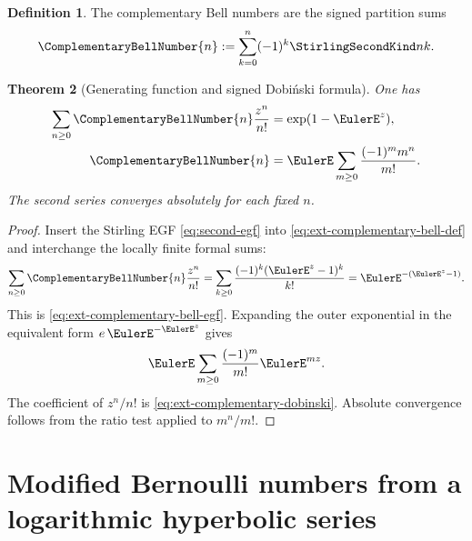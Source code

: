 \documentclass[11pt,a4paper,oneside,openany]{book}
\newtheorem{theorem}{Theorem}[chapter]
\theoremstyle{definition}
\newtheorem{definition}[theorem]{Definition}
\theoremstyle{remark}
\begin{document}
\begin{definition}
The complementary Bell numbers are the signed partition sums
\begin{equation}\label{eq:ext-complementary-bell-def}
 \ComplementaryBellNumber{n}:=\sum_{k=0}^n(-1)^k\StirlingSecondKind nk.
\end{equation}
\end{definition}

\begin{theorem}[Generating function and signed Dobi\'{n}ski formula]
One has
\begin{align}
 \sum_{n\ge0}\ComplementaryBellNumber{n}\frac{z^n}{n!}
 &=\exp(1-\EulerE^z),\label{eq:ext-complementary-bell-egf}\\
 \ComplementaryBellNumber{n}
 &=\EulerE\sum_{m\ge0}\frac{(-1)^m m^n}{m!}.\label{eq:ext-complementary-dobinski}
\end{align}
The second series converges absolutely for each fixed \(n\).
\end{theorem}
\begin{proof}
Insert the Stirling EGF \eqref{eq:second-egf} into
\eqref{eq:ext-complementary-bell-def} and interchange the locally finite
formal sums:
\[
 \sum_{n\ge0}\ComplementaryBellNumber{n}\frac{z^n}{n!}
 =\sum_{k\ge0}\frac{(-1)^k(\EulerE^z-1)^k}{k!}
 =\EulerE^{-(\EulerE^z-1)}.
\]
This is \eqref{eq:ext-complementary-bell-egf}.  Expanding the outer exponential
in the equivalent form \(e\,\EulerE^{-\EulerE^z}\) gives
\[
 \EulerE\sum_{m\ge0}\frac{(-1)^m}{m!}\EulerE^{mz}.
\]
The coefficient of \(z^n/n!\) is \eqref{eq:ext-complementary-dobinski}.
Absolute convergence follows from the ratio test applied to \(m^n/m!\).
\end{proof}

\section{Modified Bernoulli numbers from a logarithmic hyperbolic series}
\end{document}
